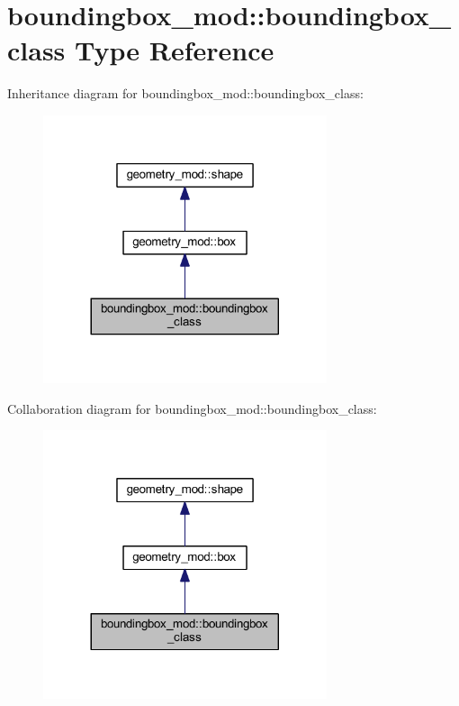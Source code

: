 \hypertarget{structboundingbox__mod_1_1boundingbox__class}{}\section{boundingbox\+\_\+mod\+:\+:boundingbox\+\_\+class Type Reference}
\label{structboundingbox__mod_1_1boundingbox__class}


Inheritance diagram for boundingbox\+\_\+mod\+:\+:boundingbox\+\_\+class\+:\nopagebreak
\begin{figure}[H]
\begin{center}
\leavevmode
\includegraphics[width=236pt]{structboundingbox__mod_1_1boundingbox__class__inherit__graph}
\end{center}
\end{figure}


Collaboration diagram for boundingbox\+\_\+mod\+:\+:boundingbox\+\_\+class\+:\nopagebreak
\begin{figure}[H]
\begin{center}
\leavevmode
\includegraphics[width=236pt]{structboundingbox__mod_1_1boundingbox__class__coll__graph}
\end{center}
\end{figure}
